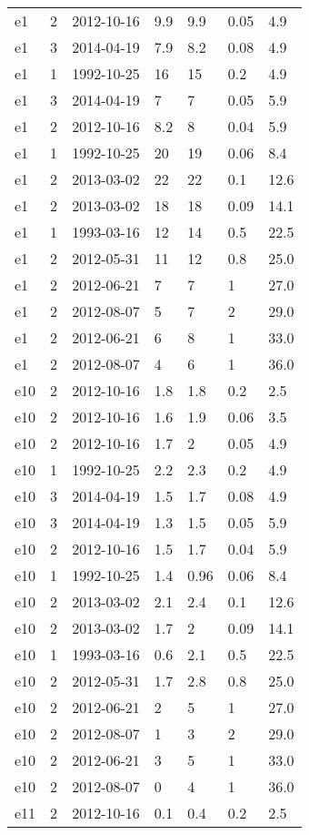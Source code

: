 \begin{table*}[htp]
\begin{tabular}{llll}
e1 & 2 & 2012-10-16 & 9.9 & 9.9 & 0.05 & 4.9 \\
e1 & 3 & 2014-04-19 & 7.9 & 8.2 & 0.08 & 4.9 \\
e1 & 1 & 1992-10-25 & 16 & 15 & 0.2 & 4.9 \\
e1 & 3 & 2014-04-19 & 7 & 7 & 0.05 & 5.9 \\
e1 & 2 & 2012-10-16 & 8.2 & 8 & 0.04 & 5.9 \\
e1 & 1 & 1992-10-25 & 20 & 19 & 0.06 & 8.4 \\
e1 & 2 & 2013-03-02 & 22 & 22 & 0.1 & 12.6 \\
e1 & 2 & 2013-03-02 & 18 & 18 & 0.09 & 14.1 \\
e1 & 1 & 1993-03-16 & 12 & 14 & 0.5 & 22.5 \\
e1 & 2 & 2012-05-31 & 11 & 12 & 0.8 & 25.0 \\
e1 & 2 & 2012-06-21 & 7 & 7 & 1 & 27.0 \\
e1 & 2 & 2012-08-07 & 5 & 7 & 2 & 29.0 \\
e1 & 2 & 2012-06-21 & 6 & 8 & 1 & 33.0 \\
e1 & 2 & 2012-08-07 & 4 & 6 & 1 & 36.0 \\
e10 & 2 & 2012-10-16 & 1.8 & 1.8 & 0.2 & 2.5 \\
e10 & 2 & 2012-10-16 & 1.6 & 1.9 & 0.06 & 3.5 \\
e10 & 2 & 2012-10-16 & 1.7 & 2 & 0.05 & 4.9 \\
e10 & 1 & 1992-10-25 & 2.2 & 2.3 & 0.2 & 4.9 \\
e10 & 3 & 2014-04-19 & 1.5 & 1.7 & 0.08 & 4.9 \\
e10 & 3 & 2014-04-19 & 1.3 & 1.5 & 0.05 & 5.9 \\
e10 & 2 & 2012-10-16 & 1.5 & 1.7 & 0.04 & 5.9 \\
e10 & 1 & 1992-10-25 & 1.4 & 0.96 & 0.06 & 8.4 \\
e10 & 2 & 2013-03-02 & 2.1 & 2.4 & 0.1 & 12.6 \\
e10 & 2 & 2013-03-02 & 1.7 & 2 & 0.09 & 14.1 \\
e10 & 1 & 1993-03-16 & 0.6 & 2.1 & 0.5 & 22.5 \\
e10 & 2 & 2012-05-31 & 1.7 & 2.8 & 0.8 & 25.0 \\
e10 & 2 & 2012-06-21 & 2 & 5 & 1 & 27.0 \\
e10 & 2 & 2012-08-07 & 1 & 3 & 2 & 29.0 \\
e10 & 2 & 2012-06-21 & 3 & 5 & 1 & 33.0 \\
e10 & 2 & 2012-08-07 & 0 & 4 & 1 & 36.0 \\
e11 & 2 & 2012-10-16 & 0.1 & 0.4 & 0.2 & 2.5 \\

\end{tabular}
\end{table*}
